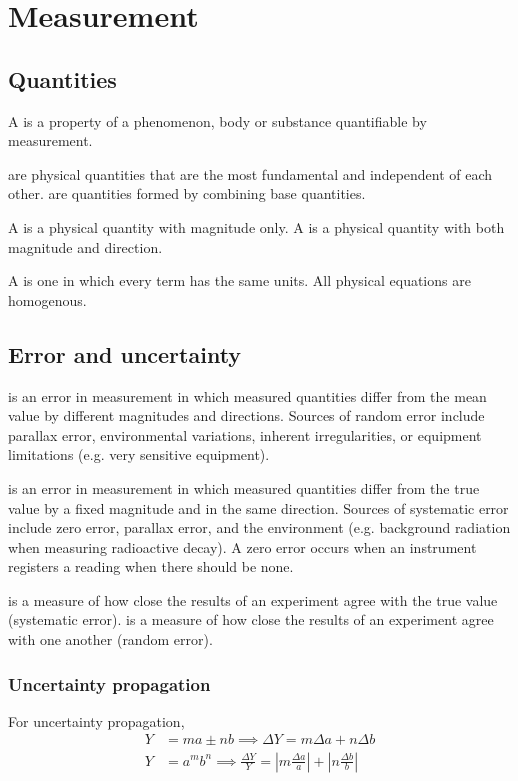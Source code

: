 \documentclass[Physics.tex]{subfiles}
\begin{document}
\chapter{Measurement}
\section{Quantities}
A  is a property of a phenomenon, body or substance quantifiable by measurement.

 are physical quantities that are the most fundamental and independent of each other.  are quantities formed by combining base quantities.

A  is a physical quantity with magnitude only. A  is a physical quantity with both magnitude and direction.

A  is one in which every term has the same units. All physical equations are homogenous.
\section{Error and uncertainty}
 is an error in measurement in which measured quantities differ from the mean value by different magnitudes and directions. Sources of random error include parallax error, environmental variations, inherent irregularities, or equipment limitations (e.g. very sensitive equipment).

 is an error in measurement in which measured quantities differ from the true value by a fixed magnitude and in the same direction. Sources of systematic error include zero error, parallax error, and the environment (e.g. background radiation when measuring radioactive decay). A zero error occurs when an instrument registers a reading when there should be none.

 is a measure of how close the results of an experiment agree with the true value (systematic error).  is a measure of how close the results of an experiment agree with one another (random error).
\subsection{Uncertainty propagation}
For uncertainty propagation, \begin{align}Y &= ma \pm nb \implies {\Delta}Y = m{\Delta}a + n{\Delta}b\\
Y &= a^mb^n \implies \frac{{\Delta}Y}{Y} = \left|m\frac{{\Delta}a}{a}\right| + \left|n\frac{{\Delta}b}{b}\right|\end{align}
\end{document}
